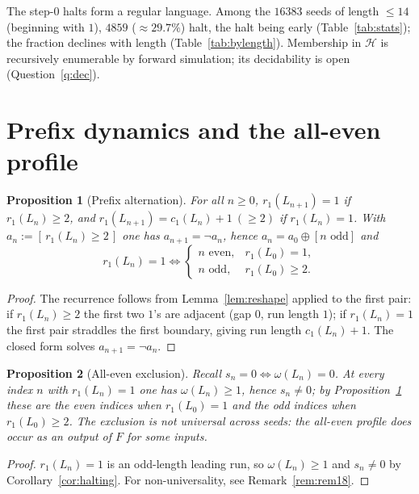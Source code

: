 \documentclass[11pt,reqno]{amsart}
\theoremstyle{plain}
\newtheorem{proposition}{Proposition}
\theoremstyle{definition}
\theoremstyle{remark}
\begin{document}
The step-$0$ halts form a regular language. Among the $16383$ seeds of length $\le 14$ (beginning with $1$), $4859$ ($\approx 29.7\%$) halt, the halt being early (Table~\ref{tab:stats}); the fraction declines with length (Table~\ref{tab:bylength}). Membership in $\mathcal H$ is recursively enumerable by forward simulation; its decidability is open (Question~\ref{q:dec}).

\section{Prefix dynamics and the all-even profile}\label{sec:prefix}
\begin{proposition}[Prefix alternation]\label{prop:prefix}
For all $n\ge 0$, $r_1(L_{n+1})=1$ if $r_1(L_n)\ge 2$, and $r_1(L_{n+1})=c_1(L_n)+1\ (\ge 2)$ if $r_1(L_n)=1$. With $a_n:=[\,r_1(L_n)\ge 2\,]$ one has $a_{n+1}=\lnot a_n$, hence $a_n=a_0\oplus[n\text{ odd}]$ and
\[ r_1(L_n)=1\iff \begin{cases} n\text{ even}, & r_1(L_0)=1,\\ n\text{ odd}, & r_1(L_0)\ge 2. \end{cases} \]
\end{proposition}
\begin{proof}
The recurrence follows from Lemma~\ref{lem:reshape} applied to the first pair: if $r_1(L_n)\ge 2$ the first two $1$'s are adjacent (gap $0$, run length $1$); if $r_1(L_n)=1$ the first pair straddles the first boundary, giving run length $c_1(L_n)+1$. The closed form solves $a_{n+1}=\lnot a_n$.
\end{proof}

\begin{proposition}[All-even exclusion]\label{prop:alleven}
Recall $s_n=0\iff\omega(L_n)=0$. At every index $n$ with $r_1(L_n)=1$ one has $\omega(L_n)\ge 1$, hence $s_n\ne 0$; by Proposition~\ref{prop:prefix} these are the even indices when $r_1(L_0)=1$ and the odd indices when $r_1(L_0)\ge 2$. The exclusion is \emph{not universal} across seeds: the all-even profile does occur as an output of $F$ for some inputs.
\end{proposition}
\begin{proof}
$r_1(L_n)=1$ is an odd-length leading run, so $\omega(L_n)\ge 1$ and $s_n\ne 0$ by Corollary~\ref{cor:halting}. For non-universality, see Remark~\ref{rem:rem18}.
\end{proof}
\end{document}
